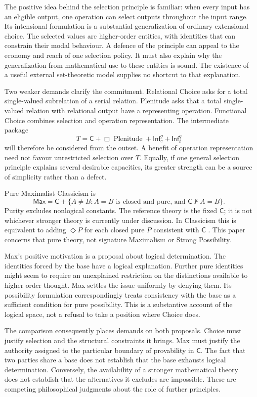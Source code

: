 \documentclass[11pt]{article}
\newcommand{\C}{\mathsf C}
\newcommand{\Max}{\mathsf{Max}}
\newcommand{\Infq}{\mathsf{Inf}^{q}}
\begin{document}
The positive idea behind the selection principle is familiar: when every input has an eligible output, one operation can select outputs throughout the input range. Its intensional formulation is a substantial generalization of ordinary extensional choice. The selected values are higher-order entities, with identities that can constrain their modal behaviour. A defence of the principle can appeal to the economy and reach of one selection policy. It must also explain why the generalization from mathematical use to these entities is sound. The existence of a useful external set-theoretic model supplies no shortcut to that explanation.

Two weaker demands clarify the commitment. Relational Choice asks for a total single-valued subrelation of a serial relation. Plenitude asks that a total single-valued relation with relational output have a representing operation. Functional Choice combines selection and operation representation. The intermediate package
\[
 T=\C+\Box\operatorname{Plenitude}+\Infq_e+\Infq_t
\]
will therefore be considered from the outset. A benefit of operation representation need not favour unrestricted selection over $T$. Equally, if one general selection principle explains several desirable capacities, its greater strength can be a source of simplicity rather than a defect.

Pure Maximalist Classicism is
\[
 \Max=\C+\{A\ne B:
 A=B\text{ is closed and pure, and }\C\nvdash A=B\}.
\]
Purity excludes nonlogical constants. The reference theory is the fixed $\C$; it is not whichever stronger theory is currently under discussion. In Classicism this is equivalent to adding $\Diamond P$ for each closed pure $P$ consistent with $\C$ \citep[\S2.4]{bacondorr}. This paper concerns that pure theory, not signature Maximalism or Strong Possibility.

Max's positive motivation is a proposal about logical determination. The identities forced by the base have a logical explanation. Further pure identities might seem to require an unexplained restriction on the distinctions available to higher-order thought. Max settles the issue uniformly by denying them. Its possibility formulation correspondingly treats consistency with the base as a sufficient condition for pure possibility. This is a substantive account of the logical space, not a refusal to take a position where Choice does.

The comparison consequently places demands on both proposals. Choice must justify selection and the structural constraints it brings. Max must justify the authority assigned to the particular boundary of provability in $\C$. The fact that two parties share a base does not establish that the base exhausts logical determination. Conversely, the availability of a stronger mathematical theory does not establish that the alternatives it excludes are impossible. These are competing philosophical judgments about the role of further principles.
\end{document}
